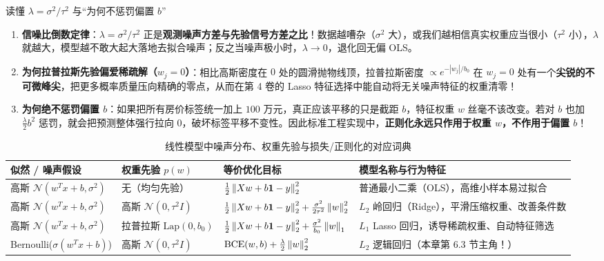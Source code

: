 \begin{insightBox}{读懂 $\lambda = \sigma^2 / \tau^2$ 与“为何不惩罚偏置 $b$”}
\begin{enumerate}
  \item \textbf{信噪比倒数定律}：$\lambda = \sigma^2/\tau^2$ 正是\textbf{观测噪声方差与先验信号方差之比}！数据越嘈杂（$\sigma^2$ 大），或我们越相信真实权重应当很小（$\tau^2$ 小），$\lambda$ 就越大，模型越不敢大起大落地去拟合噪声；反之当噪声极小时，$\lambda \to 0$，退化回无偏 OLS。
  \item \textbf{为何拉普拉斯先验偏爱稀疏解（$w_j = 0$）}：相比高斯密度在 $0$ 处的圆滑抛物线顶，拉普拉斯密度 $\propto e^{-|w_j|/b_0}$ 在 $w_j = 0$ 处有一个\textbf{尖锐的不可微峰尖}，把更多概率质量压向精确的零点，从而在第 4 卷的 Lasso 特征选择中能自动将无关噪声特征的权重清零！
  \item \textbf{为何绝不惩罚偏置 $b$}：如果把所有房价标签统一加上 $100$ 万元，真正应该平移的只是截距 $b$，特征权重 $w$ 丝毫不该改变。若对 $b$ 也加 $\frac{\lambda}{2}b^2$ 惩罚，就会把预测整体强行拉向 $0$，破坏标签平移不变性。因此标准工程实现中，\textbf{正则化永远只作用于权重 $w$，不作用于偏置 $b$}！
\end{enumerate}
\end{insightBox}

\begin{table}[htbp]
\centering
\caption{线性模型中噪声分布、权重先验与损失/正则化的对应词典}
\label{tab:ch6-prob-dict}
\footnotesize
\begin{tabularx}{\linewidth}{@{}p{27mm}p{27mm}p{35mm}X@{}}
\toprule
\textbf{似然 / 噪声假设} & \textbf{权重先验 $p(w)$} & \textbf{等价优化目标} & \textbf{模型名称与行为特征} \\
\midrule
高斯 $\mathcal{N}(w^Tx+b, \sigma^2)$ & 无（均匀先验） & $\frac{1}{2}\left\|Xw+b\mathbf{1}-y\right\|_2^2$ & 普通最小二乘（OLS），高维小样本易过拟合 \\
高斯 $\mathcal{N}(w^Tx+b, \sigma^2)$ & 高斯 $\mathcal{N}(0, \tau^2 I)$ & $\frac{1}{2}\left\|Xw+b\mathbf{1}-y\right\|_2^2 + \frac{\sigma^2}{2\tau^2}\left\|w\right\|_2^2$ & $L_2$ 岭回归（Ridge），平滑压缩权重、改善条件数 \\
高斯 $\mathcal{N}(w^Tx+b, \sigma^2)$ & 拉普拉斯 $\mathrm{Lap}(0, b_0)$ & $\frac{1}{2}\left\|Xw+b\mathbf{1}-y\right\|_2^2 + \frac{\sigma^2}{b_0}\left\|w\right\|_1$ & $L_1$ Lasso 回归，诱导稀疏权重、自动特征筛选 \\
Bernoulli($\sigma(w^Tx+b)$) & 高斯 $\mathcal{N}(0, \tau^2 I)$ & $\mathrm{BCE}(w,b) + \frac{\lambda}{2}\left\|w\right\|_2^2$ & $L_2$ 逻辑回归（本章第 6.3 节主角！） \\
\bottomrule
\end{tabularx}
\end{table}


